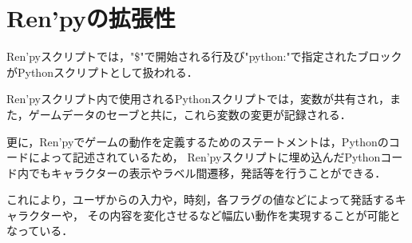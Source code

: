 \section{Ren'pyの拡張性}

  Ren'pyスクリプトでは，"\$"で開始される行及び"python:"で指定されたブロックがPythonスクリプトとして扱われる．

  Ren'pyスクリプト内で使用されるPythonスクリプトでは，変数が共有され，また，ゲームデータのセーブと共に，これら変数の変更が記録される．

  更に，Ren'pyでゲームの動作を定義するためのステートメントは，Pythonのコードによって記述されているため，
  Ren'pyスクリプトに埋め込んだPythonコード内でもキャラクターの表示やラベル間遷移，発話等を行うことができる．

  これにより，ユーザからの入力や，時刻，各フラグの値などによって発話するキャラクターや，
  その内容を変化させるなど幅広い動作を実現することが可能となっている．
  
